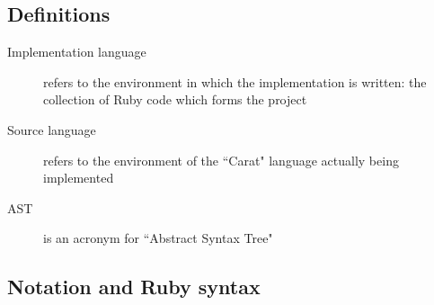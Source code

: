 \subsection{Definitions}

\begin{description}
	\item[Implementation language] refers to the environment in which the implementation is written: the collection of Ruby code which forms the project
	\item[Source language] refers to the environment of the ``Carat" language actually being implemented
	\item[AST] is an acronym for ``Abstract Syntax Tree"
\end{description}

\subsection{Notation and Ruby syntax}

